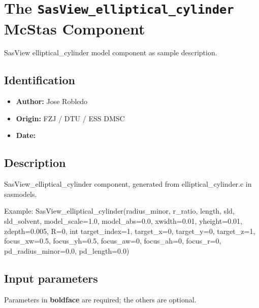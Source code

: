 \section{The \texttt{SasView\_elliptical\_cylinder} McStas Component}
SasView elliptical\_cylinder model component as sample description.

\subsection*{Identification}
\begin{itemize}
  \item \textbf{Author:} Jose Robledo
  \item \textbf{Origin:} FZJ / DTU / ESS DMSC
  \item \textbf{Date:} 
\end{itemize}

\subsection*{Description}
SasView\_elliptical\_cylinder component, generated from elliptical\_cylinder.c in sasmodels.

Example: SasView\_elliptical\_cylinder(radius\_minor, r\_ratio, length, sld, sld\_solvent, model\_scale=1.0, model\_abs=0.0, xwidth=0.01, yheight=0.01, zdepth=0.005, R=0, int target\_index=1, target\_x=0, target\_y=0, target\_z=1, focus\_xw=0.5, focus\_yh=0.5, focus\_aw=0, focus\_ah=0, focus\_r=0, pd\_radius\_minor=0.0, pd\_length=0.0)

\subsection*{Input parameters}
Parameters in \textbf{boldface} are required; the others are optional.

